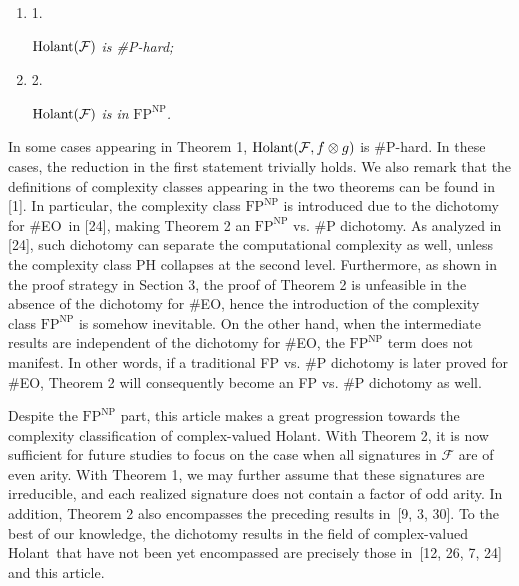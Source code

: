 \documentclass[10pt,a4paper]{article}
\begin{document}
\begin{enumerate}


\item[] 
1. 


$\textup{{Holant}}(\mathcal{F})$\emph{ is \#P-hard;}\par





\item[] 
2. 


$\textup{{Holant}}(\mathcal{F})$\emph{ is in }$\text{FP}^{\text{NP}}$\emph{.}\par





\end{enumerate}






In some cases appearing in Theorem 1, $\textup{{Holant}}(\mathcal{F},f\otimes g)$ is \#P-hard. In these cases, the reduction in the first statement trivially holds. We also remark that the definitions of complexity classes appearing in the two theorems can be found in [1]. In particular, the complexity class $\text{FP}^{\text{NP}}$ is introduced due to the dichotomy for \#EO in [24], making Theorem 2 an $\text{FP}^{\text{NP}}$ vs. \#P dichotomy. As analyzed in [24], such dichotomy can separate the computational complexity as well, unless the complexity class PH collapses at the second level. Furthermore, as shown in the proof strategy in Section 3, the proof of Theorem 2 is unfeasible in the absence of the dichotomy for \#EO, hence the introduction of the complexity class $\text{FP}^{\text{NP}}$ is somehow inevitable. On the other hand, when the intermediate results are independent of the dichotomy for \#EO, the $\text{FP}^{\text{NP}}$ term does not manifest. In other words, if a traditional FP vs. \#P dichotomy is later proved for \#EO, Theorem 2 will consequently become an FP vs. \#P dichotomy as well.\par




Despite the $\text{FP}^{\text{NP}}$ part, this article makes a great progression towards the complexity classification of complex-valued Holant. With Theorem 2, it is now sufficient for future studies to focus on the case when all signatures in $\mathcal{F}$ are of even arity. With Theorem 1, we may further assume that these signatures are irreducible, and each realized signature does not contain a factor of odd arity.
In addition, Theorem 2 also encompasses the preceding results in [9, 3, 30]. To the best of our knowledge, the dichotomy results in the field of complex-valued Holant that have not been yet encompassed are precisely those in [12, 26, 7, 24] and this article.\par
\end{document}
